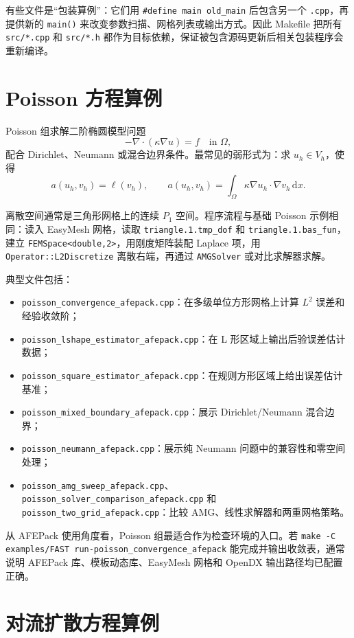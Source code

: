 \documentclass[UTF8,openany,zihao=-4,scheme=chinese]{ctexbook}
\newcommand{\file}[1]{\nolinkurl{#1}}
\newcommand{\class}[1]{\texttt{#1}}
\newcommand{\cmd}[1]{\texttt{#1}}
\begin{document}
有些文件是“包装算例”：它们用 \cmd{\#define main old\_main} 后包含另一个 \file{.cpp}，再提供新的 \class{main()} 来改变参数扫描、网格列表或输出方式。因此 Makefile 把所有 \file{src/*.cpp} 和 \file{src/*.h} 都作为目标依赖，保证被包含源码更新后相关包装程序会重新编译。

\section{Poisson 方程算例}

Poisson 组求解二阶椭圆模型问题
\[
  -\nabla\cdot(\kappa\nabla u)=f \quad \text{in }\Omega,
\]
配合 Dirichlet、Neumann 或混合边界条件。最常见的弱形式为：求 $u_h\in V_h$，使得
\[
  a(u_h,v_h)=\ell(v_h),\qquad
  a(u_h,v_h)=\int_\Omega \kappa\nabla u_h\cdot\nabla v_h\,\mathrm dx .
\]

离散空间通常是三角形网格上的连续 $P_1$ 空间。程序流程与基础 Poisson 示例相同：读入 EasyMesh 网格，读取 \file{triangle.1.tmp\_dof} 和 \file{triangle.1.bas\_fun}，建立 \class{FEMSpace<double,2>}，用刚度矩阵装配 Laplace 项，用 \class{Operator::L2Discretize} 离散右端，再通过 \class{AMGSolver} 或对比求解器求解。

典型文件包括：

\begin{itemize}[leftmargin=2em]
  \item \file{poisson\_convergence\_afepack.cpp}：在多级单位方形网格上计算 $L^2$ 误差和经验收敛阶；
  \item \file{poisson\_lshape\_estimator\_afepack.cpp}：在 L 形区域上输出后验误差估计数据；
  \item \file{poisson\_square\_estimator\_afepack.cpp}：在规则方形区域上给出误差估计基准；
  \item \file{poisson\_mixed\_boundary\_afepack.cpp}：展示 Dirichlet/Neumann 混合边界；
  \item \file{poisson\_neumann\_afepack.cpp}：展示纯 Neumann 问题中的兼容性和零空间处理；
  \item \file{poisson\_amg\_sweep\_afepack.cpp}、\file{poisson\_solver\_comparison\_afepack.cpp} 和 \file{poisson\_two\_grid\_afepack.cpp}：比较 AMG、线性求解器和两重网格策略。
\end{itemize}

从 AFEPack 使用角度看，Poisson 组最适合作为检查环境的入口。若 \cmd{make -C examples/FAST run-poisson\_convergence\_afepack} 能完成并输出收敛表，通常说明 AFEPack 库、模板动态库、EasyMesh 网格和 OpenDX 输出路径均已配置正确。

\section{对流扩散方程算例}
\end{document}
